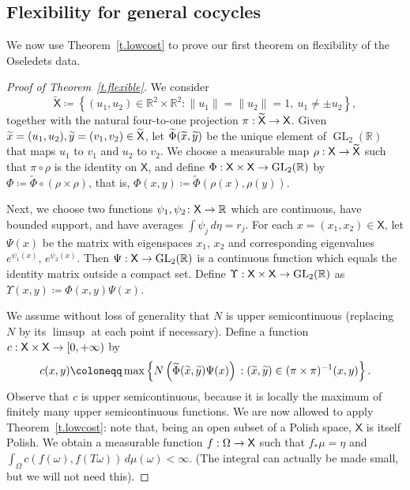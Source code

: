 \documentclass[AHL,Unicode,longabstracts,published]{cedram}
\newcommand{\R}{\mathbb{R}}
\newcommand{\sfX}{\mathsf{X}}
\newcommand{\st}{\;\mathord{:}\;}
\DeclareMathOperator{\GL}{GL}
\renewcommand*{\to}{\mathchoice{\longrightarrow}{\rightarrow}{\rightarrow}{\rightarrow}}
\let\oldtilde\tilde
\renewcommand*{\tilde}[1]{\mathchoice{\widetilde{#1}}{\widetilde{#1}}{\oldtilde{#1}}{\oldtilde{#1}}}
\DeclareMathOperator{\GL}{GL}
\newcommand{\R}{\mathbb{R}}
\begin{document}
\subsection{Flexibility for general cocycles}

We now use Theorem~\ref{t.lowcost} to prove our first theorem on flexibility of the Oseledets data.

\begin{proof}[Proof of Theorem~\ref{t.flexible}]
We consider
\begin{equation}
\widetilde{\sfX} \coloneqq \left\{ (u_1,u_2) \in \R^2\times \R^2: \|u_1\| = \|u_2\| = 1, \ u_1 \neq \pm u_2\right\},
\end{equation}
together with the natural four-to-one projection $\pi: \widetilde{\sfX} \to \sfX$. Given $\tilde{x} = (u_1,u_2),\tilde{y} = (v_1,v_2) \in \widetilde{\sfX}$, let $\widetilde{\Phi}(\tilde{x},\tilde{y})$ be the unique element of $\GL_2(\R)$ that maps $u_1$ to $v_1$ and $u_2$ to $v_2$. We choose a measurable map $\rho: \sfX \to \widetilde{\sfX}$ such that $\pi\circ \rho$ is the identity on $\sfX$, and define $\Phi:\sfX \times \sfX \to \GL_2(\R)$ by $\Phi\coloneqq \widetilde{\Phi} \circ (\rho\times \rho)$, that is, $\Phi(x,y) \coloneqq \widetilde{\Phi}(\rho(x),\rho(y))$.

Next, we choose two functions $\psi_1, \psi_2 \colon \sfX \to \R$ which are continuous, have bounded support, and have averages $\int \psi_j \, d\eta = r_j$. For each $x = (x_1,x_2) \in \sfX$, let $\Psi(x)$ be the matrix with eigenspaces $x_1$, $x_2$ and corresponding eigenvalues $e^{\psi_1(x)}$, $e^{\psi_2(x)}$. Then $\Psi:\sfX \to \GL_2(\R)$ is a continuous function which equals the identity matrix outside a compact set. Define $\Upsilon: \sfX \times \sfX \to \GL_2(\R)$ as $\Upsilon(x,y) \coloneqq \Phi(x,y)\Psi(x)$.

We assume without loss of generality that $N$ is upper semicontinuous (replacing~$N$ by its $\limsup$ at each point if necessary). Define a function $c:\sfX \times \sfX \to [0,+\infty)$ by
\begin{equation}\label{e.def_c}
c(x,y) \coloneqq
\max\left\{ N\left(\widetilde{\Phi}(\tilde{x},\tilde{y})\Psi(x)\right) \st (\tilde{x},\tilde{y}) \in (\pi\times \pi)^{-1}(x,y)\right\}.
\end{equation}
Observe that $c$ is upper semicontinuous, because it is locally the maximum of finitely many upper semicontinuous functions. We are now allowed to apply Theorem~\ref{t.lowcost}: note that, being an open subset of a Polish space, $\sfX$ is itself Polish. We obtain a measurable function $f:\Omega \to \sfX$ such that $f_*\mu = \eta$ and $\int_{\Omega}c(f(\omega),f(T\omega)) \, d\mu(\omega) < \infty $. (The integral can actually be made small, but we will not need this).


\end{proof}
\end{document}
